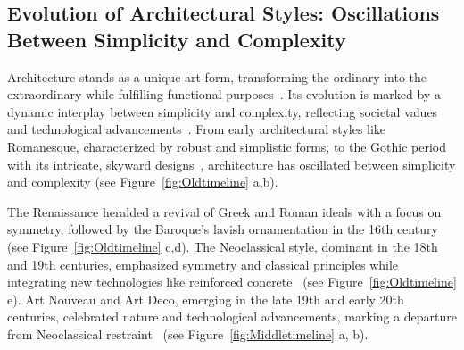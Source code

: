



\subsection{Evolution of Architectural Styles: Oscillations Between Simplicity and Complexity}
\label{subsec:TimelineArchitectureStyles}

Architecture stands as a unique art form, transforming the ordinary into the extraordinary while fulfilling functional purposes~\cite{Hnin2022}.
Its evolution is marked by a dynamic interplay between simplicity and complexity, reflecting societal values and technological advancements~\cite{Economakis2023}.
From early architectural styles like Romanesque, characterized by robust and simplistic forms, to the Gothic period with its intricate, skyward designs~\cite{Stacbond2020}, architecture has oscillated between simplicity and complexity (see Figure~\ref{fig:Oldtimeline} a,b).

The Renaissance heralded a revival of Greek and Roman ideals with a focus on symmetry, followed by the Baroque's lavish ornamentation in the 16th century~\cite{Economakis2023} (see Figure~\ref{fig:Oldtimeline} c,d).
The Neoclassical style, dominant in the 18th and 19th centuries, emphasized symmetry and classical principles while integrating new technologies like reinforced concrete~\cite{Economakis2023} (see Figure~\ref{fig:Oldtimeline} e).
Art Nouveau and Art Deco, emerging in the late 19th and early 20th centuries, celebrated nature and technological advancements, marking a departure from Neoclassical restraint~\cite{Salas2018, Arora2023} (see Figure~\ref{fig:Middletimeline} a, b).

